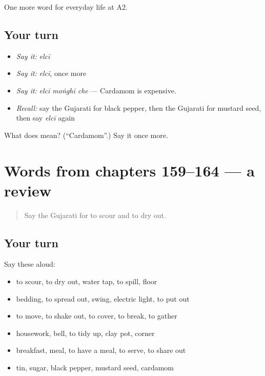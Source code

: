 \begin{grammarlens}[title={What you've built}]
One more word for everyday life at A2.
\end{grammarlens}

\subsection*{Your turn}
\begin{itemize}
\raggedright
  \item \emph{Say it:} \emph{elcī}
  \item \emph{Say it:} \emph{elcī}, once more
  \item \emph{Say it:} \emph{elcī moṅghī che} — Cardamom is expensive.
  \item \emph{Recall:} say the Gujarati for black pepper, then the Gujarati for mustard seed, then say \emph{elcī} again
\end{itemize}

\begin{tcolorbox}[breakable,colback=teal!4,colframe=teal!35!black,title={Before you move on}]
What does  mean? (\textquotedblleft{}Cardamom\textquotedblright{}.) Say it once more.
\end{tcolorbox}
\section[(dialogue)]{Words from chapters 159–164 — a review}

\label{lesson:GU-R164-review-159-164}



\begin{quote}
Say the Gujarati for to scour and to dry out.
\end{quote}

\subsection*{Your turn}
Say these aloud:

\begin{itemize}
\raggedright
  \item to scour, to dry out, water tap, to spill, floor
  \item bedding, to spread out, swing, electric light, to put out
  \item to move, to shake out, to cover, to break, to gather
  \item housework, bell, to tidy up, clay pot, corner
  \item breakfast, meal, to have a meal, to serve, to share out
  \item tin, sugar, black pepper, mustard seed, cardamom
\end{itemize}

